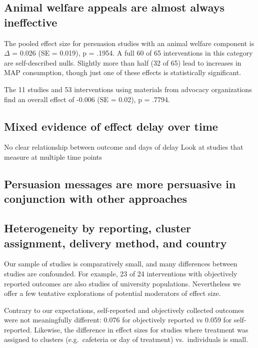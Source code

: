 \documentclass[sn-nature,pdflatex]{sn-jnl}
\begin{document}
\subsection{Animal welfare appeals are almost always
ineffective}\label{sec2.8}

The pooled effect size for persuasion studies with an animal welfare
component is \(\Delta\) = 0.026 (SE = 0.019), p = .1954. A full 60 of 65
interventions in this category are self-described nulls. Slightly more
than half (32 of 65) lead to increases in MAP consumption, though just
one of these effects is statistically significant.

The 11 studies and 53 interventions using materials from advocacy
organizations find an overall effect of -0.006 (SE = 0.02), p = .7794.

\subsection{Mixed evidence of effect delay over
time}\label{mixed-evidence-of-effect-delay-over-time}

No clear relationship between outcome and days of delay Look at studies
that measure at multiple time points

\subsection{Persuasion messages are more persuasive in conjunction with
other
approaches}\label{persuasion-messages-are-more-persuasive-in-conjunction-with-other-approaches}

\subsection{Heterogeneity by reporting, cluster assignment, delivery
method, and country}\label{sec2.10}

Our sample of studies is comparatively small, and many differences
between studies are confounded. For example, 23 of 24 interventions with
objectively reported outcomes are also studies of university
populations. Nevertheless we offer a few tentative explorations of
potential moderators of effect size.

Contrary to our expectations, self-reported and objectively collected
outcomes were not meaningfully different: 0.076 for objectively reported
vs 0.059 for self-reported. Likewise, the difference in effect sizes for
studies where treatment was assigned to clusters (e.g.~cafeteria or day
of treatment) vs.~individuals is small.
\end{document}
